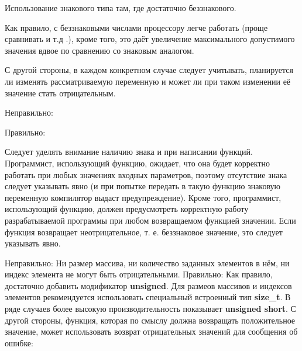 \begin{typerror}
	Использование знакового типа там, где достаточно беззнакового.

	Как правило, с беззнаковыми числами процессору легче работать (проще сравнивать и т.д .), кроме того, это даёт увеличение максимального допустимого значения вдвое по сравнению со знаковым аналогом.

	С другой стороны, в каждом конкретном случае следует учитывать, планируется ли изменять рассматриваемую переменную и может ли при таком изменении её значение стать отрицательным.

	Неправильно:

	Правильно:


	Следует уделять внимание наличию знака и при написании функций.
	Программист, использующий функцию, ожидает, что она будет корректно работать при любых значениях входных параметров, поэтому отсутствие знака следует указывать явно (и при попытке передать в такую функцию знаковую переменную компилятор выдаст предупреждение).
	Кроме того, программист, использующий функцию, должен предусмотреть корректную работу разрабатываемой программы при любом возвращаемом функцией значении.
	Если функция возвращает неотрицательное, т. е. беззнаковое значение, это следует указывать явно.

	Неправильно:
	Ни размер массива, ни количество заданных элементов в нём, ни индекс элемента не могут быть отрицательными.
	Правильно:
	Как правило, достаточно добавить модификатор \textbf{unsigned}.
	Для размеов массивов и индексов элементов рекомендуется использовать специальный встроенный тип \textbf{size\_t}.
	В ряде случаев более высокую производительность показывает \textbf{unsigned short}.
	С  другой стороны, функция, которая по смыслу должна возвращать положительное значение, может использовать возврат отрицательных значений для сообщения об ошибке:

	
\end{typerror}
